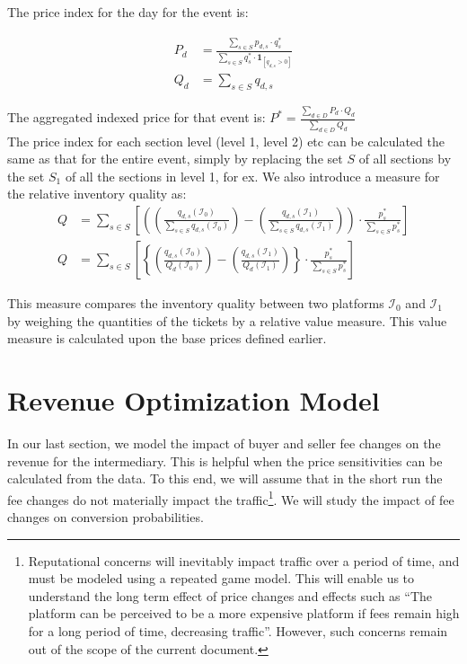 \documentclass[letterpaper, 12pt]{article}
\begin{document}
The price index for the day for the event is:

\begin{align*}
	P_d &=  \frac{\sum_{s\in S} p_{d,s}\cdot q^*_s}{\sum_{s\in S} q^*_s\cdot \pmb{1}_{[q_{d,s} > 0]} }\\
	Q_d &= \sum_{s\in S} q_{d,s}
\end{align*}

The aggregated indexed price for that event is: $P^* = \frac{\sum_{d\in D}P_d\cdot Q_d}{\sum_{d\in D}Q_d}$ \\

The price index for each section level (level 1, level 2) etc can be calculated the same as that for the entire event, simply by replacing the set $S$ of all sections by the set $S_1$ of all the sections in level 1, for ex. We also introduce a measure for the relative inventory quality as:
\begin{align*}
	Q & = \sum_{s\in S} \left[\left( \left( \frac{q_{d,s}(\mathcal{I}_0)}{\sum_{s\in S}q_{d,s}(\mathcal{I}_0)} \right) -  \left( \frac{q_{d,s}(\mathcal{I}_1)}{\sum_{s\in S}q_{d,s}(\mathcal{I}_1)} \right)\right)\cdot \frac{p^*_s}{\sum_{s\in S}p^*_s}\right]\\
	Q & = \sum_{s\in S} \left[\left\{ \left( \frac{q_{d,s}(\mathcal{I}_0)}{Q_d(\mathcal{I}_0)} \right) -  \left( \frac{q_{d,s}(\mathcal{I}_1)}{Q_d(\mathcal{I}_1)}\right) \right\}\cdot \frac{p^*_s}{\sum_{s\in S}p^*_s}\right]
\end{align*}

This measure compares the inventory quality between two platforms $\mathcal{I}_0$ and $\mathcal{I}_1$ by weighing the quantities of the tickets by a relative value measure. This value measure is calculated upon the base prices defined earlier.  



\section{Revenue Optimization Model}\label{revm}
In our last section, we model the impact of buyer and seller fee changes on the revenue for the intermediary. This is helpful when the price sensitivities can be calculated from the data. To this end, we will assume that in the short run the fee changes do not materially impact the traffic\footnote{Reputational concerns will inevitably impact traffic over a period of time, and must be modeled using a repeated game model. This will enable us to understand the long term effect of price changes and effects such as ``The platform can be perceived to be a more expensive platform if fees remain high for a long period of time, decreasing traffic''. However, such concerns remain out of the scope of the current document.}. We will study the impact of fee changes on conversion probabilities.
\end{document}
